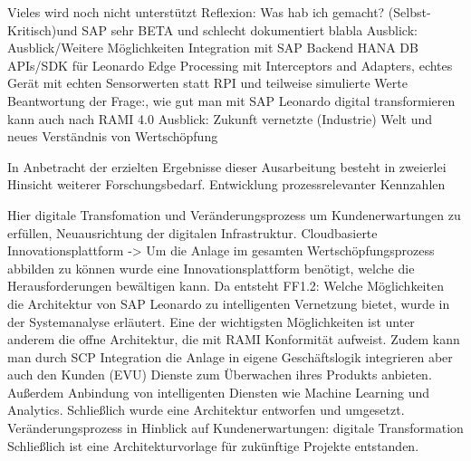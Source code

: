 Vieles wird noch nicht unterstützt
Reflexion:
Was hab ich gemacht? (Selbst-Kritisch)und SAP sehr BETA und schlecht dokumentiert blabla
\newline
Ausblick:
Ausblick/Weitere Möglichkeiten
Integration mit SAP Backend
HANA DB
APIs/SDK für Leonardo
Edge Processing mit Interceptors and Adapters, echtes Gerät mit echten Sensorwerten statt RPI und teilweise simulierte Werte
\newline
Beantwortung der Frage:, wie gut man mit SAP Leonardo digital transformieren kann auch nach RAMI 4.0 
Ausblick: Zukunft vernetzte (Industrie) Welt und neues Verständnis von Wertschöpfung


In Anbetracht der erzielten Ergebnisse dieser Ausarbeitung besteht in zweierlei Hinsicht weiterer Forschungsbedarf. 
Entwicklung prozessrelevanter Kennzahlen

Hier digitale Transfomation und Veränderungsprozess um Kundenerwartungen zu erfüllen, Neuausrichtung der digitalen Infrastruktur. Cloudbasierte Innovationsplattform ->
Um die Anlage im gesamten Wertschöpfungsprozess abbilden zu können wurde eine Innovationsplattform benötigt, welche die Herausforderungen bewältigen kann. Da entsteht FF1.2: Welche Möglichkeiten die Architektur von SAP Leonardo zu intelligenten Vernetzung bietet, wurde in der Systemanalyse erläutert. Eine der wichtigsten Möglichkeiten ist unter anderem die offne Architektur, die mit RAMI Konformität aufweist. Zudem kann man durch SCP Integration die Anlage in eigene Geschäftslogik integrieren aber auch den Kunden (EVU) Dienste zum Überwachen ihres Produkts anbieten. Außerdem Anbindung von intelligenten Diensten wie Machine Learning und Analytics. Schließlich wurde eine Architektur entworfen und umgesetzt. 
Veränderungsprozess in Hinblick auf Kundenerwartungen: digitale Transformation
Schließlich ist eine Architekturvorlage für zukünftige Projekte entstanden. 
\newpage
